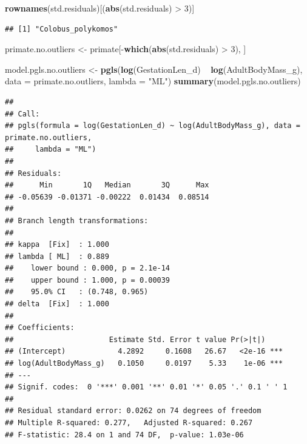 \documentclass[]{article}
\newenvironment{Shaded}{\begin{snugshade}}{\end{snugshade}}
\newcommand{\KeywordTok}[1]{\textcolor[rgb]{0.13,0.29,0.53}{\textbf{{#1}}}}
\newcommand{\DataTypeTok}[1]{\textcolor[rgb]{0.13,0.29,0.53}{{#1}}}
\newcommand{\DecValTok}[1]{\textcolor[rgb]{0.00,0.00,0.81}{{#1}}}
\newcommand{\StringTok}[1]{\textcolor[rgb]{0.31,0.60,0.02}{{#1}}}
\newcommand{\NormalTok}[1]{{#1}}
\begin{document}
\begin{Shaded}
\begin{Highlighting}[]
\KeywordTok{rownames}\NormalTok{(std.residuals)[(}\KeywordTok{abs}\NormalTok{(std.residuals) >}\StringTok{ }\DecValTok{3}\NormalTok{)]}
\end{Highlighting}
\end{Shaded}

\begin{verbatim}
## [1] "Colobus_polykomos"
\end{verbatim}

\begin{Shaded}
\begin{Highlighting}[]
\NormalTok{primate.no.outliers <-}\StringTok{ }\NormalTok{primate[-}\KeywordTok{which}\NormalTok{(}\KeywordTok{abs}\NormalTok{(std.residuals) >}\StringTok{ }\DecValTok{3}\NormalTok{), ]}
\end{Highlighting}
\end{Shaded}

\begin{Shaded}
\begin{Highlighting}[]
\NormalTok{model.pgls.no.outliers <-}\StringTok{ }\KeywordTok{pgls}\NormalTok{(}\KeywordTok{log}\NormalTok{(GestationLen_d) ~}\StringTok{ }\KeywordTok{log}\NormalTok{(AdultBodyMass_g), }\DataTypeTok{data =} \NormalTok{primate.no.outliers, }
    \DataTypeTok{lambda =} \StringTok{"ML"}\NormalTok{)}
\KeywordTok{summary}\NormalTok{(model.pgls.no.outliers)}
\end{Highlighting}
\end{Shaded}

\begin{verbatim}
## 
## Call:
## pgls(formula = log(GestationLen_d) ~ log(AdultBodyMass_g), data = primate.no.outliers, 
##     lambda = "ML")
## 
## Residuals:
##      Min       1Q   Median       3Q      Max 
## -0.05639 -0.01371 -0.00222  0.01434  0.08514 
## 
## Branch length transformations:
## 
## kappa  [Fix]  : 1.000
## lambda [ ML]  : 0.889
##    lower bound : 0.000, p = 2.1e-14
##    upper bound : 1.000, p = 0.00039
##    95.0% CI   : (0.748, 0.965)
## delta  [Fix]  : 1.000
## 
## Coefficients:
##                      Estimate Std. Error t value Pr(>|t|)    
## (Intercept)            4.2892     0.1608   26.67   <2e-16 ***
## log(AdultBodyMass_g)   0.1050     0.0197    5.33    1e-06 ***
## ---
## Signif. codes:  0 '***' 0.001 '**' 0.01 '*' 0.05 '.' 0.1 ' ' 1
## 
## Residual standard error: 0.0262 on 74 degrees of freedom
## Multiple R-squared: 0.277,   Adjusted R-squared: 0.267 
## F-statistic: 28.4 on 1 and 74 DF,  p-value: 1.03e-06
\end{verbatim}
\end{document}
